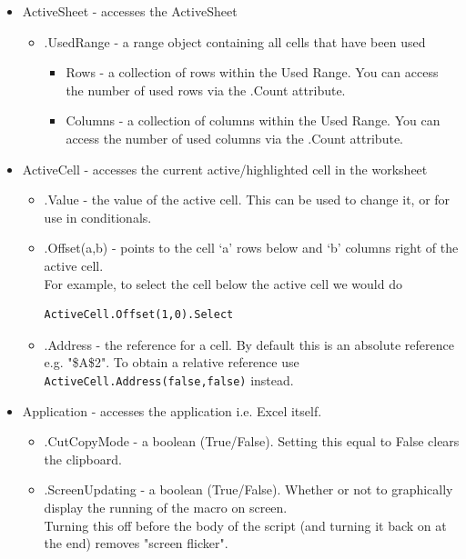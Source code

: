 \documentclass[8pt]{extarticle}
\begin{document}
\begin{multicols}{3}
\begin{itemize}
    \item ActiveSheet - accesses the ActiveSheet
    \begin{itemize}
        \item .UsedRange - a range object containing all cells that have been used
        \begin{itemize}
            \item Rows - a collection of rows within the Used Range. You can access the number of used rows via the .Count attribute.
            \item Columns - a collection of columns within the Used Range. You can access the number of used columns via the .Count attribute.
        \end{itemize}
    \end{itemize}
    \item ActiveCell - accesses the current active/highlighted cell in the worksheet
    \begin{itemize}
        \item .Value - the value of the active cell. This can be used to change it, or for use in conditionals.
        \item .Offset(a,b) - points to the cell `a' rows below and `b' columns right of the active cell. \\
        For example, to select the cell below the active cell we would do 
        \begin{lstlisting}[style=vba]
    ActiveCell.Offset(1,0).Select
        \end{lstlisting}
        \item .Address - the reference for a cell. By default this is an absolute reference e.g. "\$A\$2". To obtain a relative reference use \texttt{ActiveCell.Address(false,false)} instead.
    \end{itemize}
    \item Application - accesses the application i.e. Excel itself.
    \begin{itemize}
        \item .CutCopyMode - a boolean (True/False). Setting this equal to False clears the clipboard.
        \item .ScreenUpdating - a boolean (True/False). Whether or not to graphically display the running of the macro on screen. \\
        Turning this off before the body of the script (and turning it back on at the end) removes "screen flicker".
    \end{itemize}
\end{itemize}


\end{multicols}
\end{document}
